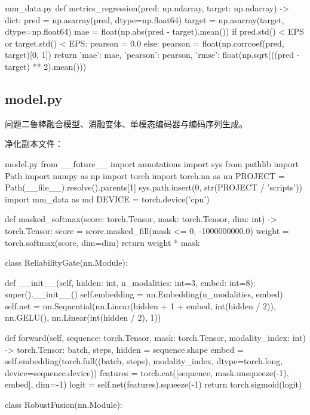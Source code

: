 \documentclass[bwprint]{gmcmthesis}
\begin{document}
\begin{appendices}
\begin{Python}{mm\_data.py}
def metrics_regression(pred: np.ndarray, target: np.ndarray) -> dict:
    pred = np.asarray(pred, dtype=np.float64)
    target = np.asarray(target, dtype=np.float64)
    mae = float(np.abs(pred - target).mean())
    if pred.std() < EPS or target.std() < EPS:
        pearson = 0.0
    else:
        pearson = float(np.corrcoef(pred, target)[0, 1])
    return {'mae': mae, 'pearson': pearson, 'rmse': float(np.sqrt(((pred - target) ** 2).mean()))}
\end{Python}

\subsection{model.py}

问题二鲁棒融合模型、消融变体、单模态编码器与编码序列生成。

净化副本文件：\texttt{}

\begin{Python}{model.py}
from __future__ import annotations
import sys
from pathlib import Path
import numpy as np
import torch
import torch.nn as nn
PROJECT = Path(__file__).resolve().parents[1]
sys.path.insert(0, str(PROJECT / 'scripts'))
import mm_data as md
DEVICE = torch.device('cpu')

def masked_softmax(score: torch.Tensor, mask: torch.Tensor, dim: int) -> torch.Tensor:
    score = score.masked_fill(mask <= 0, -1000000000.0)
    weight = torch.softmax(score, dim=dim)
    return weight * mask

class ReliabilityGate(nn.Module):

    def __init__(self, hidden: int, n_modalities: int=3, embed: int=8):
        super().__init__()
        self.embedding = nn.Embedding(n_modalities, embed)
        self.net = nn.Sequential(nn.Linear(hidden + 1 + embed, int(hidden / 2)), nn.GELU(), nn.Linear(int(hidden / 2), 1))

    def forward(self, sequence: torch.Tensor, mask: torch.Tensor, modality_index: int) -> torch.Tensor:
        batch, steps, hidden = sequence.shape
        embed = self.embedding(torch.full((batch, steps), modality_index, dtype=torch.long, device=sequence.device))
        features = torch.cat([sequence, mask.unsqueeze(-1), embed], dim=-1)
        logit = self.net(features).squeeze(-1)
        return torch.sigmoid(logit)

class RobustFusion(nn.Module):


\end{Python}
\end{appendices}
\end{document}
